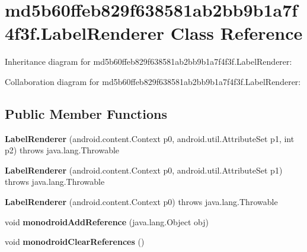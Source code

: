 \hypertarget{classmd5b60ffeb829f638581ab2bb9b1a7f4f3f_1_1_label_renderer}{}\section{md5b60ffeb829f638581ab2bb9b1a7f4f3f.\+Label\+Renderer Class Reference}
\label{classmd5b60ffeb829f638581ab2bb9b1a7f4f3f_1_1_label_renderer}


Inheritance diagram for md5b60ffeb829f638581ab2bb9b1a7f4f3f.\+Label\+Renderer\+:


Collaboration diagram for md5b60ffeb829f638581ab2bb9b1a7f4f3f.\+Label\+Renderer\+:
\subsection*{Public Member Functions}
\begin{DoxyCompactItemize}
\item 
\mbox{\label{classmd5b60ffeb829f638581ab2bb9b1a7f4f3f_1_1_label_renderer_a676d9f280baafbc8b1cd2f8d192d5420}} 
{\bfseries Label\+Renderer} (android.\+content.\+Context p0, android.\+util.\+Attribute\+Set p1, int p2)  throws java.\+lang.\+Throwable 	
\item 
\mbox{\label{classmd5b60ffeb829f638581ab2bb9b1a7f4f3f_1_1_label_renderer_adf11c884aea9ad69b88f2bc2c1c60b48}} 
{\bfseries Label\+Renderer} (android.\+content.\+Context p0, android.\+util.\+Attribute\+Set p1)  throws java.\+lang.\+Throwable 	
\item 
\mbox{\label{classmd5b60ffeb829f638581ab2bb9b1a7f4f3f_1_1_label_renderer_a145238d242c95398df7762a0dee92f4c}} 
{\bfseries Label\+Renderer} (android.\+content.\+Context p0)  throws java.\+lang.\+Throwable 	
\item 
\mbox{\label{classmd5b60ffeb829f638581ab2bb9b1a7f4f3f_1_1_label_renderer_a5c75833e54cbdb93423612b6013f3ca2}} 
void {\bfseries monodroid\+Add\+Reference} (java.\+lang.\+Object obj)
\item 
\mbox{\label{classmd5b60ffeb829f638581ab2bb9b1a7f4f3f_1_1_label_renderer_a8dd6dcc97dd63731d463ac57c6c6bf08}} 
void {\bfseries monodroid\+Clear\+References} ()
\end{DoxyCompactItemize}
